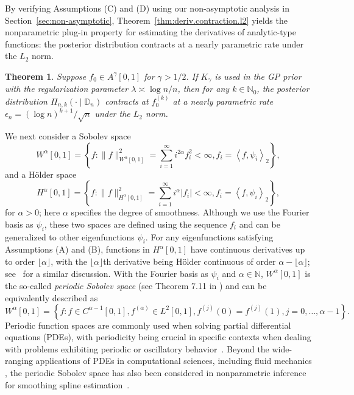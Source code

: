 \documentclass[12pt]{article}
\newcommand\data{\mathbb{D}_n}
\newcommand{\s}{\sum_{i=1}^{\infty}}
\theoremstyle{plain}
\newtheorem{theorem}{Theorem}
\theoremstyle{nonitalicremark}
\begin{document}
By verifying Assumptions (C) and (D) using our non-asymptotic analysis in Section~\ref{sec:non-asymptotic}, Theorem~\ref{thm:deriv.contraction.l2} yields the nonparametric plug-in property for estimating the derivatives of analytic-type functions: the posterior distribution contracts at a nearly parametric rate under the $L_2$ norm.



\begin{theorem}\label{thm:exp.contraction.deriv}
Suppose $f_0\in A^\gamma[0,1]$ for $\gamma>1/2$. If $K_\gamma$ is used in the GP prior with the regularization parameter $\lambda\asymp \log n/n$, then for any $k\in\mathbb{N}_0$, the posterior distribution $\Pi_{n,k}(\cdot\mid\data)$ contracts at $f_0^{(k)}$ at a nearly parametric rate $\epsilon_n = (\log n)^{k+1}/\sqrt{n}$ under the $L_2$ norm.
\end{theorem}

We next consider a Sobolev space 
\begin{equation}
W^\alpha[0,1] = \left\{f:  \|f\|^2_{W^\alpha[0,1]} = \s i^{2\alpha}f_i^2 < \infty,f_i=\left<f,\psi_i\right>_2\right\}, 
\end{equation}
and a H\"older space
\begin{equation}
H^{\alpha}[0,1]=\left\{f: \|f\|^2_{H^{\alpha}[0,1]}=\sum_{i=1}^{\infty}i^{\alpha}|f_i|<\infty,f_i=\left<f,\psi_i\right>_2\right\},
\end{equation}
for $\alpha > 0$; here $\alpha$ specifies the degree of smoothness. Although we use the Fourier basis as $\psi_i$, these two spaces are defined using the sequence $f_i$ and can be generalized to other eigenfunctions $\psi_i$. For any eigenfunctions satisfying Assumptions (A) and (B), functions in $H^{\alpha}[0,1]$ have continuous derivatives up to order $\lfloor\alpha\rfloor$, with the $\lfloor\alpha\rfloor$th derivative being H\"older continuous of order $\alpha-\lfloor\alpha\rfloor$; see~\cite{yang2017frequentist,liu2020non} for a similar discussion. With the Fourier basis as $\psi_i$ and $\alpha \in \mathbb{N}$, $W^\alpha[0,1]$ is the so-called \textit{periodic Sobolev space} (see Theorem 7.11 in \cite{wasserman2006all}) and can be equivalently described as $W^\alpha[0,1] = \left\{f:  f \in C^{\alpha-1}[0,1],  f^{(\alpha)} \in L^2[0,1],
f^{(j)}(0) = f^{(j)}(1), j = 0,\ldots, \alpha-1 \right\}.$ Periodic function spaces are commonly used when solving partial differential equations (PDEs), with periodicity being crucial in specific contexts when dealing with problems exhibiting periodic or oscillatory behavior~\citep{sani1994resume,dong2014robust}. Beyond the wide-ranging applications of PDEs in computational sciences, including fluid mechanics \citep{dong2006combined, dong2008turbulent}, the periodic Sobolev space has also been considered in nonparametric inference for smoothing spline estimation~\citep{nussbaum1985spline, sc13aos}. 
\end{document}
